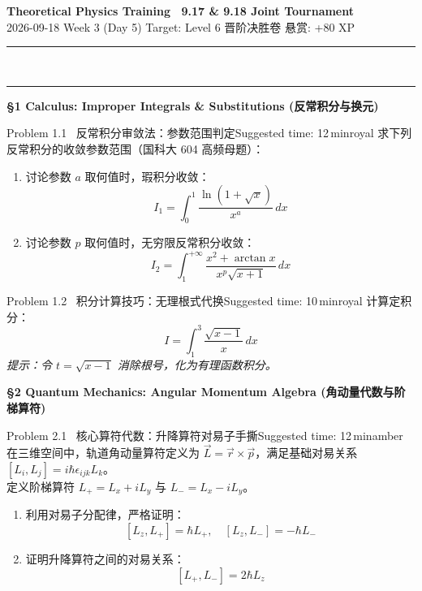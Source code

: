 \documentclass[a4paper,11pt]{article}
\begin{document}
\begin{center}
  {\LARGE\bfseries\color{navy} Theoretical Physics Training \textperiodcentered\ 9.17 \& 9.18 Joint Tournament}\\[3pt]
  {\small\sffamily\color{mist} 2026-09-18 \quad\textbar\quad Week 3 (Day 5) \quad\textbar\quad Target: Level 6 晋阶决胜卷 \quad\textbar\quad 悬赏: +80 XP}\\[-4pt]
  {\color{navy}\rule{\textwidth}{0.8pt}}\\[-11pt]
  {\color{border}\rule{\textwidth}{0.3pt}}
\end{center}

{\Large\sffamily\bfseries\color{navy} \S 1 Calculus: Improper Integrals \& Substitutions (反常积分与换元)}
\vspace{4pt}

\begin{problembox}{Problem 1.1 \textbar\ 反常积分审敛法：参数范围判定}{Suggested time: 12\,min}{royal}
求下列反常积分的收敛参数范围（国科大 604 高频母题）：
\begin{enumerate}
    \item 讨论参数 $a$ 取何值时，瑕积分收敛：
    \[ I_1 = \int_0^1 \frac{\ln(1 + \sqrt{x})}{x^a} \, dx \]
    \item 讨论参数 $p$ 取何值时，无穷限反常积分收敛：
    \[ I_2 = \int_1^{+\infty} \frac{x^2 + \arctan x}{x^p \sqrt{x + 1}} \, dx \]
\end{enumerate}
\end{problembox}
\vspace{9.5cm}

\begin{problembox}{Problem 1.2 \textbar\ 积分计算技巧：无理根式代换}{Suggested time: 10\,min}{royal}
计算定积分：
\[ I = \int_1^3 \frac{\sqrt{x - 1}}{x} \, dx \]
\textit{提示：令 $t = \sqrt{x - 1}$ 消除根号，化为有理函数积分。}
\end{problembox}
\vspace{9.5cm}

\clearpage
{\Large\sffamily\bfseries\color{navy} \S 2 Quantum Mechanics: Angular Momentum Algebra (角动量代数与阶梯算符)}
\vspace{4pt}

\begin{problembox}{Problem 2.1 \textbar\ 核心算符代数：升降算符对易子手撕}{Suggested time: 12\,min}{amber}
在三维空间中，轨道角动量算符定义为 $\vec{L} = \vec{r} \times \vec{p}$，满足基础对易关系 $[L_i, L_j] = i\hbar \epsilon_{ijk} L_k$。\\
定义阶梯算符 $L_+ = L_x + iL_y$ 与 $L_- = L_x - iL_y$。
\begin{enumerate}
    \item 利用对易子分配律，严格证明：
    \[ [L_z, L_+] = \hbar L_+, \quad [L_z, L_-] = -\hbar L_- \]
    \item 证明升降算符之间的对易关系：
    \[ [L_+, L_-] = 2\hbar L_z \]
\end{enumerate}
\end{problembox}
\vspace{9.5cm}
\end{document}
